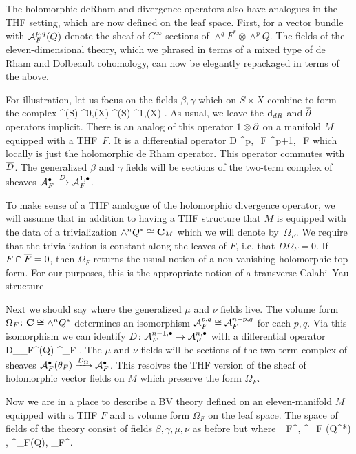 The holomorphic deRham and divergence operators also have analogues in the THF setting, which are now defined on the leaf space. First, for a vector bundle with  $\cA_{F}^{p,q}(Q)$ denote the sheaf of $C^{\infty}$ sections of $\wedge^{q} F^{*}\otimes \wedge^p Q$.
The fields of the eleven-dimensional theory, which we phrased in terms of a mixed type of de Rham and Dolbeault cohomology, can now be elegantly repackaged in terms of the above.

For illustration, let us focus on the fields $\beta,\gamma$ which on $S \times X$ combine to form the complex
\beqn\label{eqn:drdol}
\Omega^{\bu}(S) \otimes \Omega^{0,\bu}(X) \xto{1 \otimes \del} \Omega^{\bu}(S) \otimes \Omega^{1,\bu}(X) .
\eeqn
As usual, we leave the $\d_{dR}$ and $\dbar$ operators implicit.
There is an analog of this operator $1 \otimes \del$ on a manifold $M$ equipped with a THF~$F$.
It is a differential operator 
\beqn
D \colon \cA^{p,\bu}_F \to \cA^{p+1,\bu}_F
\eeqn
which locally is just the holomorphic de Rham operator. 
This operator commutes with $\thfd$.
The generalized $\beta$ and $\gamma$ fields will be sections of the two-term complex of sheaves $\cA^\bu_F \xto{D} \cA^{1,\bu}_F$.

\newcommand\Div{D_\Omega}

To make sense of a THF analogue of the holomorphic divergence operator, we will assume that in addition to having a THF structure that $M$ is equipped with the data of a trivialization $\wedge^{n} Q^* \cong \C_{M}$ which we will denote by~$\Omega_F$. We require that the trivialization is constant along the leaves of $F$, i.e. that $D\Omega_{F} = 0$. If $F \cap \Bar{F} = 0$, then $\Omega_F$ returns the usual notion of a non-vanishing holomorphic top form. For our purposes, this is the appropriate notion of a transverse Calabi--Yau structure

Next we should say where the generalized $\mu$ and $\nu$ fields live. 
The volume form $\Omega_F \colon \C \cong \wedge^n Q^*$ determines an isomorphism $\cA^{p,q}_F \cong \cA^{n-p,q}_F$ for each $p,q$.
Via this isomorphism we can identify $D \colon \cA^{n-1,\bu}_F \to \cA^{n,\bu}_F$ with a differential operator
\beqn
\Div \colon \cA_F^{\bu}(Q) \to \cA^\bu_F .
\eeqn
The $\mu$ and $\nu$ fields will be sections of the two-term complex of sheaves $\cA^\bu_F(\theta_F) \xto{\Div} \cA^\bu_F$. 
This resolves the THF version of the sheaf of holomorphic vector fields on $M$ which preserve the form $\Omega_F$. 

Now we are in a place to describe a BV theory defined on an eleven-manifold $M$ equipped with a THF $F$ and a volume form $\Omega_F$ on the leaf space.
The space of fields of the theory consist of fields $\beta,\gamma, \mu, \nu$ as before but where
\beqn
\beta \in \Pi \cA_F^\bu , \quad \gamma \in \cA^{\bu}_F (Q^*) , \quad \mu \in \Pi \cA^\bu_F(Q), \quad \nu \in \cA_F^\bu  .
\eeqn

